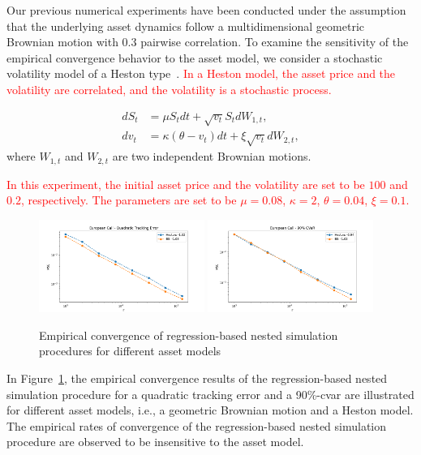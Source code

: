 Our previous numerical experiments have been conducted under the assumption that the underlying asset dynamics follow a multidimensional geometric Brownian motion with $0.3$ pairwise correlation.
To examine the sensitivity of the empirical convergence behavior to the asset model, we consider a stochastic volatility model of a Heston type~\citep{heston1993closed}.
\textcolor{red}{In a Heston model, the asset price and the volatility are correlated, and the volatility is a stochastic process.}

\begin{align*}
    dS_t &= \mu S_t dt + \sqrt{v_t} S_t dW_{1,t}, \\
    dv_t &= \kappa (\theta - v_t) dt + \xi \sqrt{v_t} dW_{2,t},
\end{align*}
where $W_{1,t}$ and $W_{2,t}$ are two independent Brownian motions.

\textcolor{red}{In this experiment, the initial asset price and the volatility are set to be $100$ and $0.2$, respectively. The parameters are set to be $\mu = 0.08$, $\kappa = 2$, $\theta = 0.04$, $\xi = 0.1$.}

\begin{figure}[ht!] 
    \centering
    \includegraphics[width=0.48\textwidth]{./project1/figures/figure10a.png}
    \includegraphics[width=0.48\textwidth]{./project1/figures/figure10b.png}
    \caption{Empirical convergence of regression-based nested simulation procedures for different asset models}
\label{fig1:sens_model}
\end{figure}

In Figure~\ref{fig1:sens_model}, the empirical convergence results of the regression-based nested simulation procedure for a quadratic tracking error and a 90\%-\gls{cvar} are illustrated for different asset models, i.e., a geometric Brownian motion and a Heston model.
The empirical rates of convergence of the regression-based nested simulation procedure are observed to be insensitive to the asset model.

